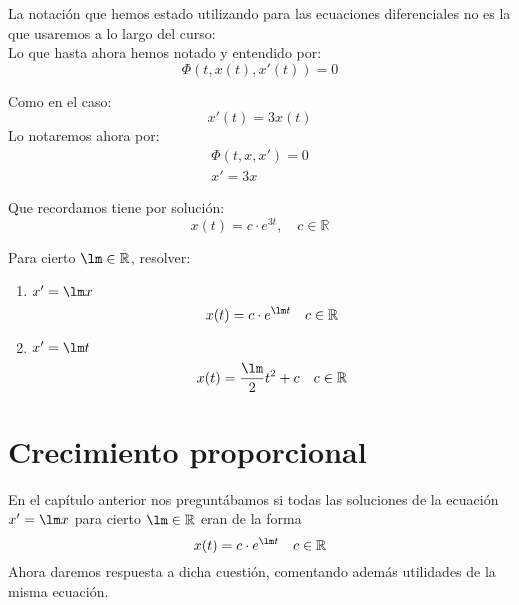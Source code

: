 \begin{notacion}
    La notación que hemos estado utilizando para las ecuaciones diferenciales no es la que usaremos a lo largo del curso:\\

    Lo que hasta ahora hemos notado y entendido por:
    \begin{equation*}
        \Phi(t,x(t),x'(t)) = 0
    \end{equation*}

    Como en el caso:
    \begin{equation*}
      x'(t) = 3x(t)  
    \end{equation*}
    Lo notaremos ahora por:
    \begin{gather*}
        \Phi(t,x,x') = 0\\
        x' = 3x
    \end{gather*}

    Que recordamos tiene por solución:
    \begin{equation*}
        x(t) = c \cdot e^{3t}, \quad c \in \mathbb{R}
    \end{equation*}
\end{notacion}

\begin{ejemplo}
    Para cierto $\lm \in \mathbb{R}$, resolver:
    \begin{enumerate}
        \item $x' = \lm x$
            \begin{equation*}
                x(t) = c \cdot e^{\lm t} \quad c \in \mathbb{R}
            \end{equation*}
        \item $x' = \lm t$
            \begin{equation*}
                x(t) = \frac{\lm}{2} t^2 + c \quad c \in \mathbb{R}
            \end{equation*}
    \end{enumerate}
\end{ejemplo}

\section{Crecimiento proporcional}
En el capítulo anterior nos preguntábamos si todas las soluciones de la ecuación $x'=\lm x$ para cierto $\lm \in \mathbb{R}$ eran de la forma
\begin{equation*}
    x(t) = c \cdot e^{\lm t} \quad c\in \mathbb{R}
\end{equation*}
Ahora daremos respuesta a dicha cuestión, comentando además utilidades de la misma ecuación.

